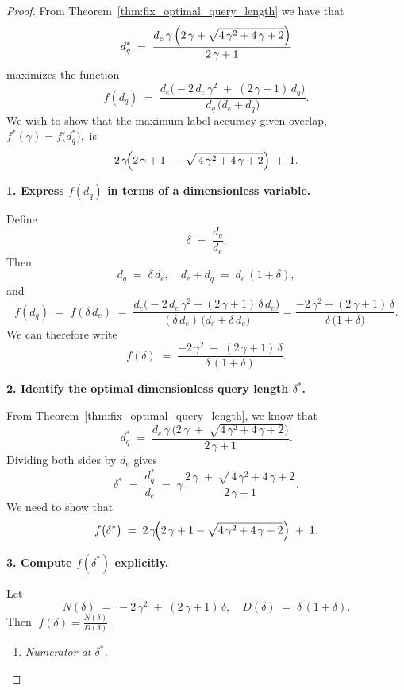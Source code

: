 \begin{proof}
From Theorem~\ref{thm:fix_optimal_query_length} we have that
\[
d_q^*
\;=\;
\frac{
  d_e\,\gamma\,\Bigl(2\,\gamma + \sqrt{4\,\gamma^2 +4\,\gamma +2}\Bigr)
}{
  2\,\gamma +1
}
\]
maximizes the function
\[
f(d_q)
\;=\;
\frac{
  d_e \bigl(-2\,d_e\,\gamma^2 \;+\; (2\,\gamma +1)\,d_q\bigr)
}{
  d_q\,\bigl(d_e + d_q\bigr)
}.
\]
We wish to show that the maximum label accuracy given overlap, 
\(\displaystyle f^*(\gamma) = f\bigl(d_q^*\bigr),\)
is 
\[
2\,\gamma\!\Bigl(
  2\,\gamma +1
  \;-\;
  \sqrt{\,4\,\gamma^2 +4\,\gamma +2}
\Bigr)
\;+\;
1.
\]

\medskip

\noindent
\textbf{1. Express $f(d_q)$ in terms of a dimensionless variable.}

Define
\[
\delta 
\;=\; 
\frac{d_q}{d_e}.
\]
Then
\[
d_q 
\;=\; 
\delta\,d_e,
\quad
d_e + d_q
\;=\;
d_e\,(1 + \delta),
\]
and
\[
f(d_q)
\;=\;
f(\delta\,d_e)
\;=\;
\frac{
  d_e \bigl(-2\,d_e\,\gamma^2 + (2\,\gamma +1)\,\delta\,d_e\bigr)
}{
  (\delta\,d_e)\,\bigl(d_e + \delta\,d_e\bigr)
}
=
\frac{
  -2\,\gamma^2 + (2\,\gamma +1)\,\delta
}{
  \delta \,\bigl(1 + \delta\bigr)
}.
\]
We can therefore write
\[
f(\delta)
\;=\;
\frac{
  -2\,\gamma^2 
  \;+\; 
  (2\,\gamma +1)\,\delta
}{
  \delta\,(1 + \delta)
}.
\]

\medskip

\noindent
\textbf{2. Identify the optimal dimensionless query length $\delta^*$.}

From Theorem~\ref{thm:fix_optimal_query_length}, we know that
\[
d_q^*
\;=\;
\frac{
  d_e\,\gamma\,
  \bigl(
    2\,\gamma \;+\; \sqrt{4\,\gamma^2 +4\,\gamma +2}
  \bigr)
}{
  2\,\gamma +1
}.
\]
Dividing both sides by \(d_e\) gives
\[
\delta^*
\;=\;
\frac{d_q^*}{d_e}
\;=\;
\gamma \,\frac{
  2\,\gamma \;+\; \sqrt{\,4\,\gamma^2 +4\,\gamma +2}
}{
  2\,\gamma +1
}.
\]
We need to show that
\[
f\bigl(\delta^*\bigr)
\;=\;
2\,\gamma\!\Bigl(2\,\gamma +1 - \sqrt{4\,\gamma^2 +4\,\gamma +2}\Bigr)
\;+\;
1.
\]

\medskip

\noindent
\textbf{3. Compute $f(\delta^*)$ explicitly.}

Let
\[
N(\delta)
\;=\;
-2\,\gamma^2 
\;+\; 
(2\,\gamma +1)\,\delta,
\quad
D(\delta)
\;=\;
\delta\,(1 + \delta).
\]
Then 
\(\;f(\delta) = \tfrac{N(\delta)}{D(\delta)}.\)

\begin{enumerate}
\item 
\textit{Numerator at \(\delta^*\).}


\end{enumerate}
\end{proof}
